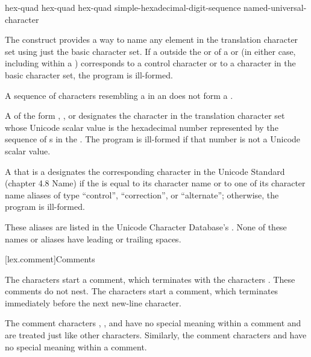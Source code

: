 \begin{bnf}
\br
     hex-quad\br
     hex-quad hex-quad\br
     simple-hexadecimal-digit-sequence \terminal{\}}\br
    named-universal-character
\end{bnf}

\pnum
The  construct provides a way to name any
element in the translation character set using just the basic character set.
If a  outside
the  or 
of a  or 
(in either case, including within a )
corresponds to a control character or to a character in the basic character set,
the program is ill-formed.
\begin{note}
A sequence of characters resembling a  in an
 does not form a
.
\end{note}

\pnum
A 
of the form  ,
  , or
designates the character in the translation character set
whose Unicode scalar value is the hexadecimal number represented by
the sequence of s
in the .
The program is ill-formed if that number is not a Unicode scalar value.

\pnum
A 
that is a 
designates the corresponding character
in the Unicode Standard (chapter 4.8 Name)
if the  is equal
to its character name or
to one of its character name aliases of
type ``control'', ``correction'', or ``alternate'';
otherwise, the program is ill-formed.
\begin{note}
These aliases are listed in
the Unicode Character Database's .
None of these names or aliases have leading or trailing spaces.
\end{note}

[lex.comment]{Comments}

\pnum
{}%
%
%
The characters \tcode{/*} start a comment, which terminates with the
characters \tcode{*/}. These comments do not nest.
%
The characters \tcode{//} start a comment, which terminates immediately before the
next new-line character.
\begin{note}
The comment characters \tcode{//}, \tcode{/*},
and \tcode{*/} have no special meaning within a \tcode{//} comment and
are treated just like other characters. Similarly, the comment
characters \tcode{//} and \tcode{/*} have no special meaning within a
\tcode{/*} comment.
\end{note}

